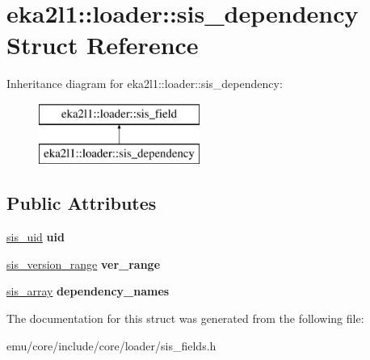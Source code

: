 \hypertarget{structeka2l1_1_1loader_1_1sis__dependency}{}\section{eka2l1\+:\+:loader\+:\+:sis\+\_\+dependency Struct Reference}
\label{structeka2l1_1_1loader_1_1sis__dependency}
Inheritance diagram for eka2l1\+:\+:loader\+:\+:sis\+\_\+dependency\+:\begin{figure}[H]
\begin{center}
\leavevmode
\includegraphics[height=2.000000cm]{structeka2l1_1_1loader_1_1sis__dependency}
\end{center}
\end{figure}
\subsection*{Public Attributes}
\begin{DoxyCompactItemize}
\item 
\mbox{\label{structeka2l1_1_1loader_1_1sis__dependency_ab6d982f4967450555e89766952de1c0a}} 
\mbox{\hyperlink{structeka2l1_1_1loader_1_1sis__uid}{sis\+\_\+uid}} {\bfseries uid}
\item 
\mbox{\label{structeka2l1_1_1loader_1_1sis__dependency_afd0c5dd01fd354c8891fcc0229191ac4}} 
\mbox{\hyperlink{structeka2l1_1_1loader_1_1sis__version__range}{sis\+\_\+version\+\_\+range}} {\bfseries ver\+\_\+range}
\item 
\mbox{\label{structeka2l1_1_1loader_1_1sis__dependency_ad4f2409f8ae6764244f7c95edb5fc650}} 
\mbox{\hyperlink{structeka2l1_1_1loader_1_1sis__array}{sis\+\_\+array}} {\bfseries dependency\+\_\+names}
\end{DoxyCompactItemize}


The documentation for this struct was generated from the following file\+:\begin{DoxyCompactItemize}
\item 
emu/core/include/core/loader/sis\+\_\+fields.\+h\end{DoxyCompactItemize}
